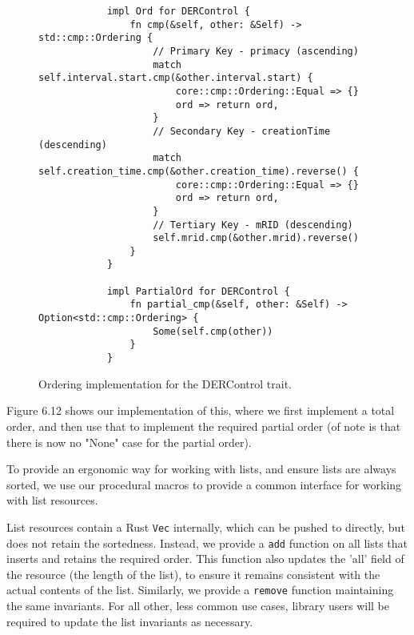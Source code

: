 \begin{figure}[H]
    \begin{center}
        \begin{lstlisting}
            impl Ord for DERControl {
                fn cmp(&self, other: &Self) -> std::cmp::Ordering {
                    // Primary Key - primacy (ascending)
                    match self.interval.start.cmp(&other.interval.start) {
                        core::cmp::Ordering::Equal => {}
                        ord => return ord,
                    }
                    // Secondary Key - creationTime (descending)
                    match self.creation_time.cmp(&other.creation_time).reverse() {
                        core::cmp::Ordering::Equal => {}
                        ord => return ord,
                    }
                    // Tertiary Key - mRID (descending)
                    self.mrid.cmp(&other.mrid).reverse()
                }
            } 

            impl PartialOrd for DERControl {
                fn partial_cmp(&self, other: &Self) -> Option<std::cmp::Ordering> {
                    Some(self.cmp(other))
                }
            }
        \end{lstlisting}
        \label{fig:dercord}
        \caption{Ordering implementation for the DERControl trait.}
    \end{center}
\end{figure}

Figure 6.12 shows our implementation of this, where we first implement a total order, and then use that to implement the required partial order (of note is that there is now no "None" case for the partial order).

To provide an ergonomic way for working with lists, and ensure lists are always sorted, we use our procedural macros to provide a common interface for working with list resources. 

List resources contain a Rust \texttt{Vec} internally, which can be pushed to directly, but does not retain the sortedness. Instead, we provide a \texttt{add} function on all lists that inserts and retains the required order. This function also updates the 'all' field of the resource (the length of the list), to ensure it remains consistent with the actual contents of the list. Similarly, we provide a \texttt{remove} function maintaining the same invariants. For all other, less common use cases, library users will be required to update the list invariants as necessary. 

